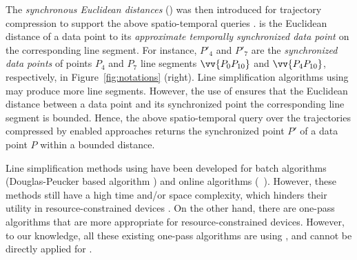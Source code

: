 

The \emph{synchronous Euclidean distances} (\sed) was then introduced for trajectory compression to support the above spatio-temporal queries \cite{Meratnia:Spatiotemporal}. \sed is the Euclidean distance of a data point to its \emph{approximate temporally synchronized data point \cite{Meratnia:Spatiotemporal}} on the corresponding line segment. For instance, $P'_4$ and $P'_7$ are the \emph{synchronized data points} of points $P_4$ and $P_7$ \wrt line segments $\vv{P_0P_{10}}$ and $\vv{P_4P_{10}}$, respectively, in Figure~\ref{fig:notations} (right).
Line simplification algorithms using \sed may produce more line segments. However, the use of \sed ensures that the Euclidean distance between a data point and its  synchronized point \wrt the corresponding line segment is bounded. Hence, the above spatio-temporal query over the trajectories compressed by \sed enabled approaches returns the synchronized point $P'$ of a data point $P$ within a bounded distance.

Line simplification methods using \sed have been developed for batch algorithms (\eg Douglas-Peucker based algorithm \dpsed \cite{Meratnia:Spatiotemporal}) and online algorithms (\eg\ \squishe \cite{Muckell:Compression}).
However, these methods still have a high time and/or space complexity, which hinders their utility in resource-constrained devices \cite{Lin:Operb}.
On the other hand, there are one-pass algorithms \cite{Williams:Longest, Sklansky:Cone, Dunham:Cone, Zhao:Sleeve, Lin:Operb}  that are more appropriate for resource-constrained devices.  However, to our knowledge, all these existing one-pass algorithms are using \ped, and cannot be directly applied for \sed.



